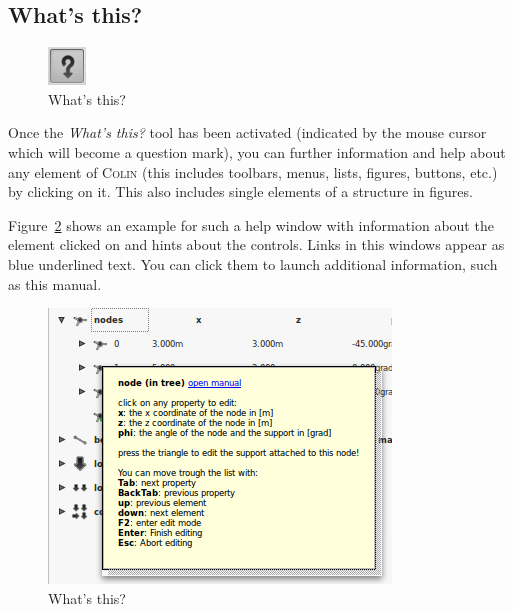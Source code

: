 \documentclass[a4paper,11pt]{report}
\newcommand{\Colin}[0]{\textsc{Colin }}
\begin{document}
\subsection{What's this?}

\begin{minipage}[h]{4cm}
\begin{figure}[H]
\begin{center}
\includegraphics[scale=0.6]{../pictures/whatsthistool.png}
\caption{What's this?}
\label{pic:whatsthistoolbar}
\end{center}
\end{figure}
\end{minipage}
\begin{minipage}[h]{\textwidth-4cm}
Once the \textit{What's this?} tool has been activated (indicated by the mouse cursor which will become a question mark), you can further information and help about any element of \Colin (this includes toolbars, menus, lists, figures, buttons, etc.) by clicking on it. This also includes single elements of a structure in figures. 

\begin{minipage}[h]{0.5\textwidth-0.25cm}
Figure~\ref{pic:whatsthis} shows an example for such a help window with information about the element clicked on and hints about the controls. Links in this windows appear as blue underlined text. You can click them to launch additional information, such as this manual.
\end{minipage}
\hfill
\begin{minipage}[h]{0.5\textwidth-0.25cm}
\begin{figure}[H]
\begin{center}
\includegraphics[width=\textwidth]{../pictures/whatsthis.png}
\caption{What's this?}
\label{pic:whatsthis}
\end{center}
\end{figure}
\end{minipage}


\end{minipage}
\end{document}
